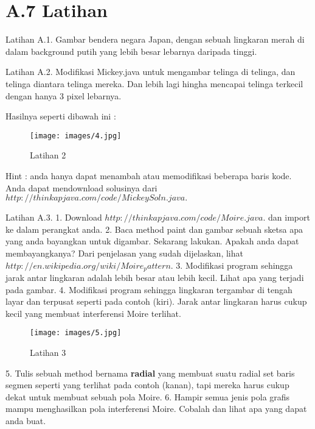 \section{A.7 Latihan}
Latihan A.1. Gambar bendera negara Japan, dengan sebuah lingkaran merah di dalam background putih yang lebih besar lebarnya daripada tinggi.

Latihan A.2. Modifikasi Mickey.java untuk mengambar telinga di telinga, dan telinga diantara telinga mereka. Dan lebih lagi hingha mencapai telinga terkecil dengan hanya 3 pixel lebarnya.

Hasilnya seperti dibawah ini :
\begin{figure}[H]
	\centering \texttt{[image: images/4.jpg]}
	\caption{Latihan 2}
	\label{fig:binaryTreeRekursif}
\end{figure}
Hint : anda hanya dapat menambah atau memodifikasi beberapa baris kode.
Anda dapat mendownload solusinya dari $http://thinkapjava.com/code/MickeySoln.java.$

Latihan A.3. 
1.	Download $http://thinkapjava.com/code/Moire.java.$ dan import ke dalam perangkat anda.
2.	Baca method paint dan gambar sebuah sketsa apa yang anda bayangkan untuk digambar. Sekarang lakukan. Apakah anda dapat membayangkanya? Dari penjelasan yang sudah dijelaskan, lihat $http://en.wikipedia.org/wiki/Moire_pattern.$
3.	Modifikasi program sehingga jarak antar lingkaran adalah lebih besar atau lebih kecil. Lihat apa yang terjadi pada gambar.
4.	Modifikasi program sehingga lingkaran tergambar di tengah layar dan terpusat seperti pada contoh (kiri). Jarak antar lingkaran harus cukup kecil yang membuat interferensi Moire terlihat.
\begin{figure}[H]
	\centering \texttt{[image: images/5.jpg]}
	\caption{Latihan 3}
	\label{fig:binaryTreeRekursif}
\end{figure}
5.	Tulis sebuah method bernama \textbf{radial} yang membuat suatu radial set baris segmen seperti yang terlihat pada contoh (kanan), tapi mereka harus cukup dekat untuk membuat sebuah pola Moire.
6.	Hampir semua jenis pola grafis mampu menghasilkan pola interferensi Moire. Cobalah dan lihat apa yang dapat anda buat.
